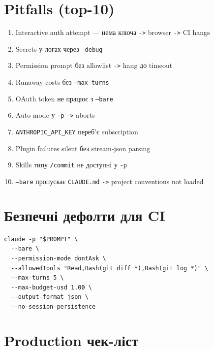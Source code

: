 \documentclass[11pt,a4paper]{article}
\begin{document}
\section{Pitfalls (top-10)}

\begin{enumerate}
\item Interactive auth attempt --- нема ключа \texttt{->} browser \texttt{->} CI hangs
\item Secrets у логах через \texttt{--debug}
\item Permission prompt без allowlist \texttt{->} hang до timeout
\item Runaway costs без \texttt{--max-turns}
\item OAuth token не працює з \texttt{--bare}
\item Auto mode у \texttt{-p} \texttt{->} aborts
\item \texttt{ANTHROPIC\_API\_KEY} переб'є subscription
\item Plugin failures silent без stream-json parsing
\item Skills типу \texttt{/commit} не доступні у \texttt{-p}
\item \texttt{--bare} пропускає \texttt{CLAUDE.md} \texttt{->} project conventions not loaded
\end{enumerate}

\section{Безпечні дефолти для CI}

\begin{lstlisting}
claude -p "$PROMPT" \
  --bare \
  --permission-mode dontAsk \
  --allowedTools "Read,Bash(git diff *),Bash(git log *)" \
  --max-turns 5 \
  --max-budget-usd 1.00 \
  --output-format json \
  --no-session-persistence
\end{lstlisting}

\section{Production чек-ліст}
\end{document}
